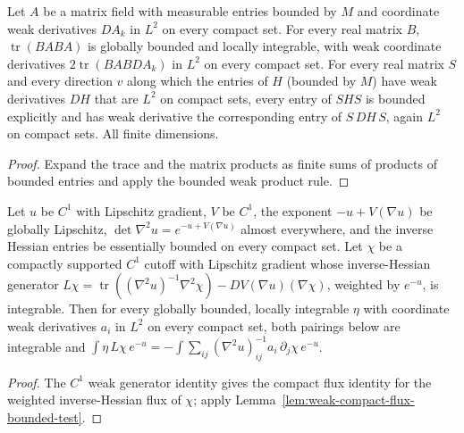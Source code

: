 \begin{lemma}
  \label{lem:weak-bounded-trace-quadratic}
  \leanok
  Let $A$ be a matrix field with measurable entries bounded by $M$ and coordinate weak derivatives $DA_k$ in $L^2$ on every compact set.
  For every real matrix $B$, $\operatorname{tr}(BABA)$ is globally bounded and locally integrable, with weak coordinate derivatives
  $2\operatorname{tr}(BABDA_k)$ in $L^2$ on every compact set. For every real matrix $S$ and every direction $v$ along which the entries of
  $H$ (bounded by $M$) have weak derivatives $DH$ that are $L^2$ on compact sets, every entry of $SHS$ is bounded explicitly and has weak
  derivative the corresponding entry of $S\,DH\,S$, again $L^2$ on compact sets. All finite dimensions.
\end{lemma}
\begin{proof}
  \leanok
  Expand the trace and the matrix products as finite sums of products of bounded entries and apply the bounded weak product rule.
\end{proof}

\begin{lemma}
  \label{lem:letwin-weak-rough-cutoff-generator}
  \leanok
  Let $u$ be $C^1$ with Lipschitz gradient, $V$ be $C^1$, the exponent $-u+V(\nabla u)$ be globally Lipschitz,
  $\det\nabla^2u=e^{-u+V(\nabla u)}$ almost everywhere, and the inverse Hessian entries be essentially bounded on every compact set.
  Let $\chi$ be a compactly supported $C^1$ cutoff with Lipschitz gradient whose inverse-Hessian generator
  $L\chi=\operatorname{tr}((\nabla^2u)^{-1}\nabla^2\chi)-DV(\nabla u)(\nabla\chi)$, weighted by $e^{-u}$, is integrable. Then for every
  globally bounded, locally integrable $\eta$ with coordinate weak derivatives $a_i$ in $L^2$ on every compact set, both pairings below are
  integrable and $\int\eta\,L\chi\,e^{-u}=-\int\sum_{ij}(\nabla^2u)^{-1}_{ij}a_i\,\partial_j\chi\,e^{-u}$.
\end{lemma}
\begin{proof}
  \leanok
  The $C^1$ weak generator identity gives the compact flux identity for the weighted inverse-Hessian flux of $\chi$; apply
  Lemma~\ref{lem:weak-compact-flux-bounded-test}.
\end{proof}

